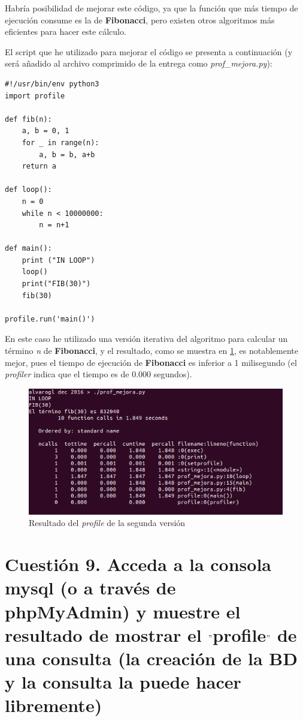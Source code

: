 Habría posibilidad de mejorar este código, ya que la función que más tiempo de ejecución consume es la de \textbf{Fibonacci}, pero existen otros algoritmos más eficientes para hacer este cálculo.

El script que he utilizado para mejorar el código se presenta a continuación (y será añadido al archivo comprimido de la entrega como \textit{prof\_mejora.py}):

\begin{lstlisting}
#!/usr/bin/env python3
import profile

def fib(n):
	a, b = 0, 1
	for _ in range(n):
		a, b = b, a+b
	return a

def loop():
	n = 0
	while n < 10000000:
		n = n+1

def main():
	print ("IN LOOP")
	loop()
	print("FIB(30)")
	fib(30)

profile.run('main()')
\end{lstlisting}

En este caso he utilizado una versión iterativa del algoritmo para calcular un término \textit{n} de \textbf{Fibonacci}, y el resultado, como se muestra en \ref{cuestion8-profile2}, es notablemente mejor, pues el tiempo de ejecución de \textbf{Fibonacci} es inferior a 1 milisegundo (el \textit{profiler} indica que el tiempo es de 0.000 segundos).

\begin{figure}[H]
	\centering
	\includegraphics[scale=0.6]{cuestion8-profile2.png}
	\caption{Resultado del \textit{profile} de la segunda versión} \label{cuestion8-profile2}
\end{figure}

\section{Cuestión 9. Acceda a la consola mysql (o a través de phpMyAdmin) y muestre el resultado de mostrar el $"$profile$"$ de una consulta (la creación de la BD y la consulta la puede hacer libremente)}


